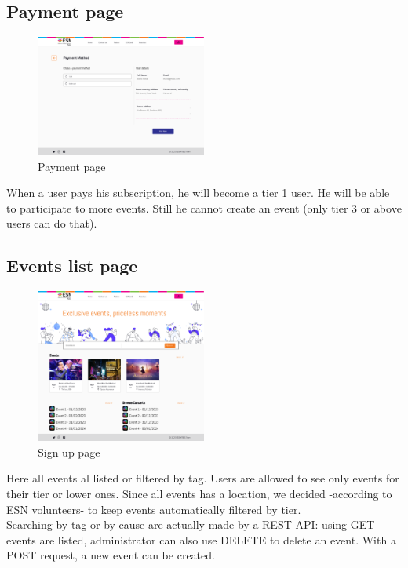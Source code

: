 \subsection{Payment page}
\begin{figure}[H]
    \centering
    \includegraphics[width=0.5\textwidth]{images/PaymentMethod.png}
    \caption{Payment page}
    \label{fig:payment}
\end{figure}
When a user pays his subscription, he will become a tier 1 user. He will be able to participate to more
events. Still he cannot create an event (only tier 3 or above users can do that). 
\subsection{Events list page}
\begin{figure}[H]
    \centering
    \includegraphics[width=0.5\textwidth]{images/EventList.png}
    \caption{Sign up page}
    \label{fig:events}
\end{figure}
Here all events al listed or filtered by tag. Users are allowed to see only events for their tier
or lower ones. Since all events has a location, we decided -according to ESN volunteers- to keep
events automatically filtered by tier.\\
Searching by tag or by cause are actually made by a REST API: using GET events are listed, administrator
can also use DELETE to delete an event. With a POST request, a new event can be created.\\
